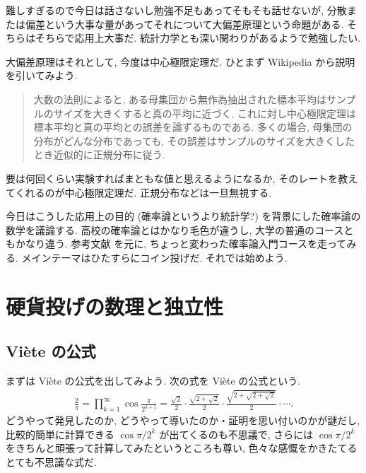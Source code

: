 \documentclass[openany, a4paper, oneside]{jsbook}
\theoremstyle{break}
\theoremstyle{breakdefn}
\begin{document}
難しすぎるので今日は話さないし勉強不足もあってそもそも話せないが,
分散または偏差という大事な量があってそれについて大偏差原理という命題がある.
そちらはそちらで応用上大事だ.
統計力学とも深い関わりがあるようで勉強したい.

大偏差原理はそれとして, 今度は中心極限定理だ.
ひとまず Wikipedia から説明を引いてみよう.
\begin{quote}
大数の法則によると, ある母集団から無作為抽出された標本平均はサンプルのサイズを大きくすると真の平均に近づく.
これに対し中心極限定理は標本平均と真の平均との誤差を論ずるものである.
多くの場合, 母集団の分布がどんな分布であっても, その誤差はサンプルのサイズを大きくしたとき近似的に正規分布に従う.
\end{quote}

要は何回くらい実験すればまともな値と思えるようになるか, そのレートを教えてくれるのが中心極限定理だ.
正規分布などは一旦無視する.

今日はこうした応用上の目的 (確率論というより統計学?) を背景にした確率論の数学を議論する.
高校の確率論とはかなり毛色が違うし, 大学の普通のコースともかなり違う.
参考文献 \cite{MarkKac1} を元に, ちょっと変わった確率論入門コースを走ってみる.
メインテーマはひたすらにコイン投げだ.
それでは始めよう.
\section{硬貨投げの数理と独立性}

\subsection{Vi\`ete の公式 \label{Hinashiro_math_party_1_probability_15}}


まずは Vi\`ete の公式を出してみよう.
次の式を Vi\`ete の公式という.
\begin{align}
 \frac{2}{\pi}
 =
 \prod_{k=1}^{\infty} \cos \frac{\pi}{2^{k+1}}
 =
 \frac{\sqrt{2}}{2} \cdot \frac{\sqrt{2 + \sqrt{2}}}{2} \cdot \frac{\sqrt{2 + \sqrt{2 + \sqrt{2}}}}{2} \cdot \cdots.
\end{align}
どうやって発見したのか, どうやって導いたのか・証明を思い付いのかが謎だし,
比較的簡単に計算できる $\cos \pi/2^k$ が出てくるのも不思議で,
さらには $\cos \pi / 2^k$ をきちんと頑張って計算してみたというところも尊い,
色々な感慨をかきたてるとても不思議な式だ.
\end{document}
